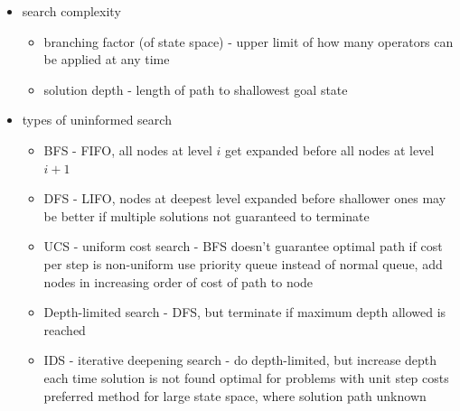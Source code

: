 \documentclass[11pt]{article}
\newcommand{\ee}[1]{\ensuremath{#1}}
\begin{document}
\begin{description}
\begin{itemize}
\begin{itemize}
	\end{itemize}
	\item search complexity
	\begin{itemize}
		\item branching factor (of state space) - upper limit of how many operators can be applied at any time
		\item solution depth - length of path to shallowest goal state
	\end{itemize}
	\item types of uninformed search
	\begin{itemize}
		\item BFS - FIFO, all nodes at level \ee{i} get expanded before all nodes at level \ee{i + 1}
		\item DFS - LIFO, nodes at deepest level expanded before shallower ones
		\subitem may be better if multiple solutions
		\subitem not guaranteed to terminate
		\item UCS - uniform cost search - BFS doesn't guarantee optimal path if cost per step is non-uniform
		\subitem use priority queue instead of normal queue, add nodes in increasing order of cost of path to node
		\item Depth-limited search - DFS, but terminate if maximum depth allowed is reached
		\item IDS - iterative deepening search - do depth-limited, but increase depth each time solution is not found
		\subitem optimal for problems with unit step costs
		\subitem preferred method for large state space, where solution path unknown
	\end{itemize}

\end{itemize}


\end{description}
\end{document}
